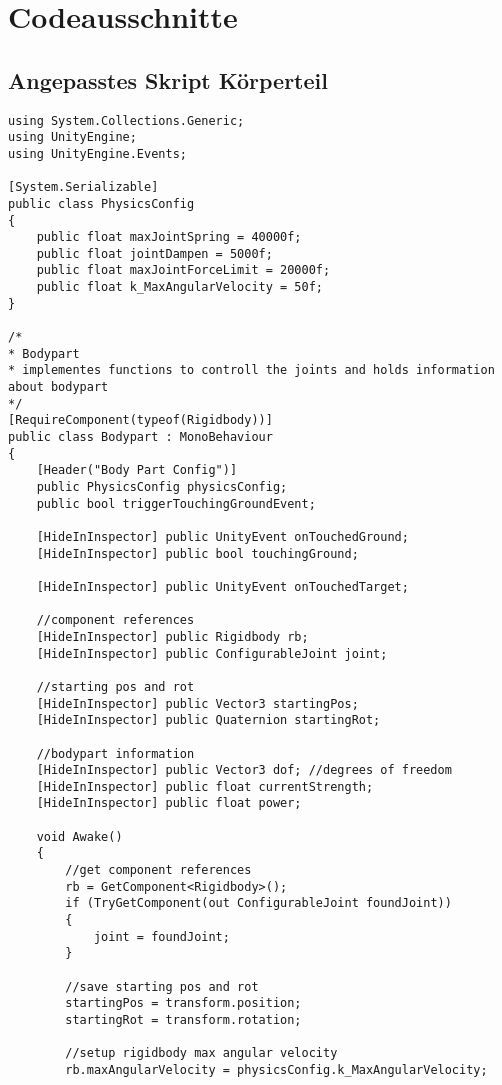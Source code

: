 \chapter{Codeausschnitte}
\section{Angepasstes Skript Körperteil}
\label{code:körperteil}
\begin{lstlisting}[caption={Körperteil Skript},captionpos=b,label={lst:skript_körperteil}]
using System.Collections.Generic;
using UnityEngine;
using UnityEngine.Events;

[System.Serializable]
public class PhysicsConfig
{
    public float maxJointSpring = 40000f;
    public float jointDampen = 5000f;
    public float maxJointForceLimit = 20000f;
    public float k_MaxAngularVelocity = 50f;
}

/*
* Bodypart
* implementes functions to controll the joints and holds information about bodypart
*/
[RequireComponent(typeof(Rigidbody))]
public class Bodypart : MonoBehaviour
{
    [Header("Body Part Config")]
    public PhysicsConfig physicsConfig;
    public bool triggerTouchingGroundEvent;

    [HideInInspector] public UnityEvent onTouchedGround;
    [HideInInspector] public bool touchingGround;

    [HideInInspector] public UnityEvent onTouchedTarget;

    //component references
    [HideInInspector] public Rigidbody rb;
    [HideInInspector] public ConfigurableJoint joint;

    //starting pos and rot
    [HideInInspector] public Vector3 startingPos;
    [HideInInspector] public Quaternion startingRot;

    //bodypart information
    [HideInInspector] public Vector3 dof; //degrees of freedom
    [HideInInspector] public float currentStrength;
    [HideInInspector] public float power;

    void Awake()
    {
        //get component references
        rb = GetComponent<Rigidbody>();
        if (TryGetComponent(out ConfigurableJoint foundJoint))
        {
            joint = foundJoint;
        }

        //save starting pos and rot
        startingPos = transform.position;
        startingRot = transform.rotation;

        //setup rigidbody max angular velocity
        rb.maxAngularVelocity = physicsConfig.k_MaxAngularVelocity;


\end{lstlisting}
